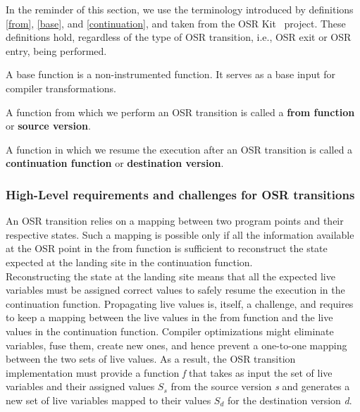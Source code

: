 In the reminder of this section, we use the terminology introduced by definitions \ref{from}, \ref{base}, and \ref{continuation}, and taken from the OSR Kit~\cite{OSRKit} project.
These definitions hold, regardless of the type of OSR transition, i.e., OSR exit or OSR entry, being performed.\\

\begin{definition}\label{base}
A base function is a non-instrumented function. 
It serves as a base input for compiler transformations.
\end{definition}

\begin{definition}\label{from}
A function from which we perform an OSR transition is called a \textbf{from function} or \textbf{source version}.
\end{definition}

\begin{definition}\label{continuation}
A function in which we resume the execution after an OSR transition is called a \textbf{continuation function} or \textbf{destination version}.
\end{definition}

\subsubsection{High-Level requirements and challenges for OSR transitions}\label{HLREQ}

An OSR transition relies on a mapping between two program points and their respective states.
Such a mapping is possible only if all the information available at the OSR point in the from function is sufficient to reconstruct the state expected at the landing site in the continuation function.\\

Reconstructing the state at the landing site means that all the expected live variables must be assigned  correct values to safely resume the execution in the continuation function.
Propagating live values is, itself, a challenge, and requires to keep a mapping between the live values in the from function and the live values in the continuation function.
Compiler optimizations might eliminate variables, fuse them, create new ones, and hence prevent a one-to-one mapping between the two sets of live values. 
As a result, the OSR transition implementation must provide a function \textit{f} that takes as input the set of live variables and their assigned values $S_s$ from the source version \textit{s} and generates a new set of live variables mapped to their values $S_d$ for the destination version \textit{d}.

